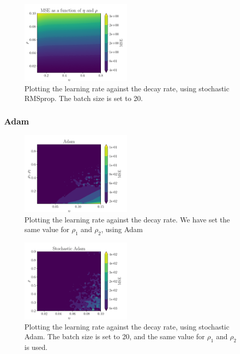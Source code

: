 \begin{figure}[ht!]
    \centering
    \includegraphics[width = 0.475\textwidth]{../figs/RMS_Prop_stochastic_eta_rho.pdf}
    \caption{Plotting the learning rate against the decay rate, using stochastic RMSprop. The batch size is set to 20.}
    \label{fig: RMS_Prop_stochastic_eta_rho}
\end{figure}

\subsubsection{Adam}
\begin{figure}[ht!]
    \centering
    \includegraphics[width = 0.475\textwidth]{../figs/Adam_eta_rho.pdf}
    \caption{Plotting the learning rate against the decay rate. We have set the same value for $\rho_1$ and $\rho_2$, using Adam}
    \label{fig: Adam_eta_rho.pdf}
\end{figure}
\begin{figure}[ht!]
    \centering
    \includegraphics[width = 0.475\textwidth]{../figs/Adam_stochastic_eta_rho.pdf}
    \caption{Plotting the learning rate against the decay rate, using stochastic Adam. The batch size is set to 20, and the same value for $\rho_1$ and $\rho_2$ is used.}
    \label{fig: Adam_stochastic_eta_rho.pdf}
\end{figure}

